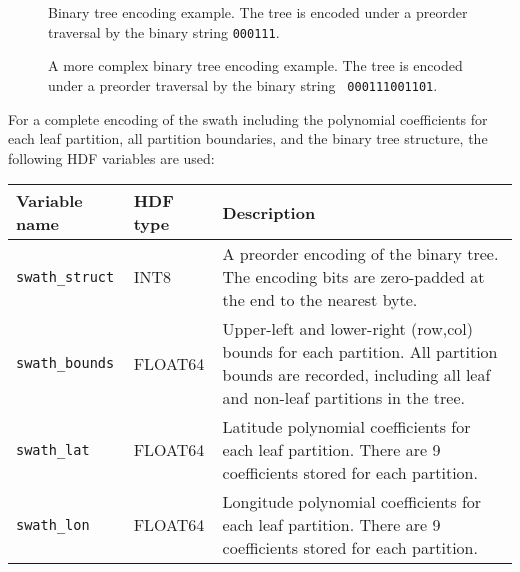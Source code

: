 \begin{figure}
  \begin{center}
    \caption[Binary tree encoding example]{
      Binary tree encoding example.  The tree is encoded under a
      preorder traversal by the binary string {\tt 000111}.
    }
    \label{binary}
  \end{center}
\end{figure}

\begin{figure}
  \begin{center}
    \caption[A more complex binary tree encoding example]{
      A more complex binary tree encoding example.  The tree is
      encoded under a preorder traversal by the binary string {\tt
      000111001101}.
    }
    \label{binary_complex}
  \end{center}
\end{figure}

For a complete encoding of the swath including the polynomial
coefficients for each leaf partition, all partition boundaries, and
the binary tree structure, the following HDF variables are used:

\begin{tabular}{|l|l|p{7.5cm}|}

  \hline 
  
  Variable name & HDF type & Description \\ \hline 

  {\tt swath\_struct} & INT8 & A preorder encoding of the binary
  tree. The encoding bits are zero-padded at the end to the nearest
  byte. \\ \hline

  {\tt swath\_bounds} & FLOAT64 & Upper-left and lower-right (row,col)
  bounds for each partition. All partition bounds are recorded,
  including all leaf and non-leaf partitions in the tree. \\ \hline

  {\tt swath\_lat} & FLOAT64 & Latitude polynomial coefficients for
  each leaf partition. There are 9 coefficients stored for each
  partition. \\ \hline

  {\tt swath\_lon} & FLOAT64 & Longitude polynomial coefficients for
  each leaf partition. There are 9 coefficients stored for each
  partition. \\ \hline

\end{tabular}

